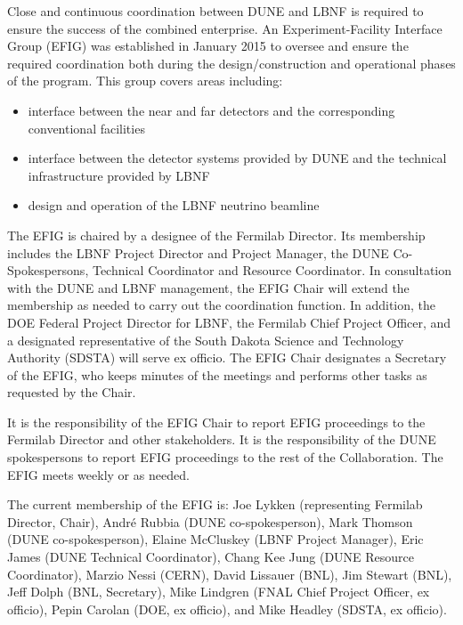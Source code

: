 Close and continuous coordination between DUNE and LBNF is
required to ensure the success of the combined enterprise.
An Experiment-Facility Interface Group (EFIG) was established
in January 2015 to oversee and ensure the required coordination
both during the design/construction and operational
phases of the program. This group covers areas including:
\begin{itemize}
\item  interface between the near and far detectors and the
corresponding conventional facilities
\item interface between the detector systems provided by
DUNE and the technical infrastructure provided by LBNF
\item design and operation of the LBNF neutrino beamline
\end{itemize}

The EFIG is chaired by a designee of the Fermilab Director.
Its membership includes the LBNF Project Director and Project Manager,
the DUNE Co-Spokespersons, Technical Coordinator and Resource Coordinator.
In consultation with the DUNE and LBNF management, the EFIG Chair will
extend the membership as needed %
to carry out the coordination
function. In addition, the DOE Federal Project Director for LBNF,
the Fermilab Chief Project Officer, and a designated representative
of the South Dakota Science and Technology Authority (SDSTA) will
serve ex officio. The EFIG Chair designates a Secretary of the EFIG,
who keeps minutes of the meetings and performs other tasks as
requested by the Chair.

It is the responsibility of the EFIG Chair to report EFIG proceedings
to the Fermilab Director and other stakeholders. It is the responsibility
of the DUNE spokespersons to report EFIG proceedings to the rest of
the Collaboration. The EFIG meets weekly or as needed.

The current membership of the EFIG is:
Joe Lykken (representing Fermilab Director, Chair),
Andr\'e Rubbia (DUNE co-spokesperson),
Mark Thomson (DUNE co-spokesperson),
Elaine McCluskey (LBNF Project Manager),
Eric James (DUNE Technical Coordinator),
Chang Kee Jung (DUNE Resource Coordinator),
Marzio Nessi (CERN),
David Lissauer (BNL),
Jim Stewart (BNL),
Jeff Dolph (BNL, Secretary),
Mike Lindgren (FNAL Chief Project Officer, ex officio),
Pepin Carolan (DOE, ex officio), and 
Mike Headley (SDSTA, ex officio).


